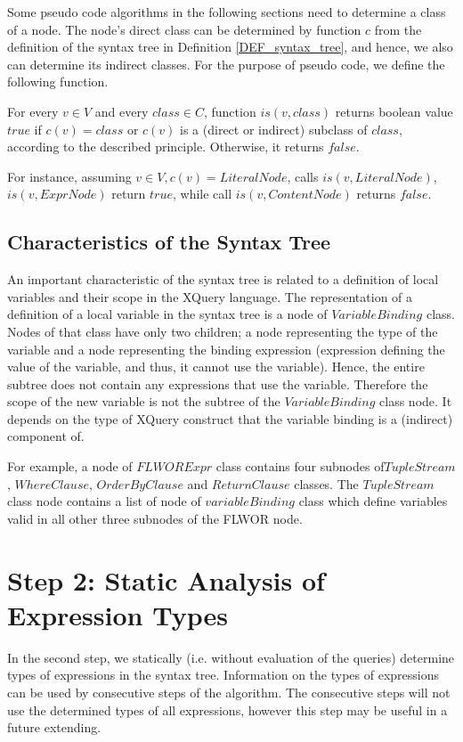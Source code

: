 Some pseudo code algorithms in the following sections need to determine a class of a node. The node's direct class can be determined by function $c$ from the definition of the syntax tree in Definition \ref{DEF_syntax_tree}, and hence, we also can determine its indirect classes. For the purpose of pseudo code, we define the following function.

\begin{define}For every $v \in V$ and every $class \in C$, function $is(v, class)$ returns boolean value $true$ if $c(v) = class$ or $c(v)$ is a (direct or indirect) subclass of $class$, according to the described principle. Otherwise, it returns $false$.
\end{define}

For instance, assuming $v \in V, c(v) = LiteralNode$, calls $is(v, LiteralNode)$, $is(v, ExprNode)$ return $true$, while call $is(v, ContentNode)$ returns $false$.

\subsection{Characteristics of the Syntax Tree}
An important characteristic of the syntax tree is related to a definition of local variables and their scope in the XQuery language. The representation of a definition of a local variable in the syntax tree is a node of $VariableBinding$ class. Nodes of that class have only two children; a node representing the type of the variable and a node representing the binding expression (expression defining the value of the variable, and thus, it cannot use the variable). Hence, the entire subtree does not contain any expressions that use the variable. Therefore the scope of the new variable is not the subtree of the $VariableBinding$ class node. It depends on the type of XQuery construct that the variable binding is a (indirect) component of.

For example, a node of $FLWORExpr$ class contains four subnodes of\linebreak $TupleStream$, $WhereClause$, $OrderByClause$ and $ReturnClause$ classes. The $TupleStream$ class node contains a list of node of $variableBinding$ class which define variables valid in all other three subnodes of the FLWOR node.



\section{Step 2: Static Analysis of Expression Types}
In the second step, we statically (i.e. without evaluation of the queries) determine types of expressions in the syntax tree. Information on the types of expressions can be used by consecutive steps of the algorithm. The consecutive steps will not use the determined types of all expressions, however this step may be useful in a future extending.

